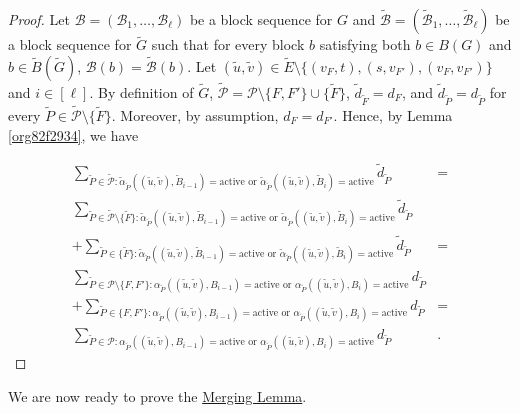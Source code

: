 \documentclass[fontsize=11pt,paper=a4]{book}
\begin{document}
\begin{proof}
Let \(\mathcal{B}=(\mathscr{B}_1,\dots,\mathscr{B}_{\ell})\) be a block sequence for \(G\) and \(\tilde{\mathcal{B}}=(\tilde{\mathscr{B}}_1,\dots,\tilde{\mathscr{B}}_{\ell})\) be a block sequence for \(\tilde{G}\) such that for every block \(b\) satisfying both \(b\in B(G)\) and \(b\in\tilde{B}(\tilde{G})\), \(\mathcal{B}(b)=\tilde{\mathcal{B}}(b)\).
Let \((\tilde{u},\tilde{v})\in\tilde{E}\setminus\{(v_F,t),(s,v_{F'}),(v_F,v_{F'})\}\) and \(i\in[\ell]\).
By definition of \(\tilde{G}\), \(\tilde{\mathcal{P}}=\mathcal{P}\setminus\{F,F'\}\cup\{\tilde{F}\}\), \(\tilde{d}_{\tilde{F}}=d_F\), and \(\tilde{d}_{\tilde{P}}=d_{\tilde{P}}\) for every \(\tilde{P}\in\tilde{\mathcal{P}}\setminus\{\tilde{F}\}\).
Moreover, by assumption, \(d_F=d_{F'}\).
Hence, by Lemma \ref{org82f2934}, we have

\begin{align*}
\sum_{\tilde{P}\in\tilde{\mathcal{P}}:\tilde{\alpha}_{\tilde{P}}((\tilde{u},\tilde{v}),\tilde{B}_{i-1})=\mathrm{active}\text{ or }\tilde{\alpha}_{\tilde{P}}((\tilde{u},\tilde{v}),\tilde{B}_i)=\mathrm{active}}\tilde{d}_{\tilde{P}}&=\\
\sum_{\tilde{P}\in\tilde{\mathcal{P}}\setminus\{\tilde{F}\}:\tilde{\alpha}_{\tilde{P}}((\tilde{u},\tilde{v}),\tilde{B}_{i-1})=\mathrm{active}\text{ or }\tilde{\alpha}_{\tilde{P}}((\tilde{u},\tilde{v}),\tilde{B}_i)=\mathrm{active}}\tilde{d}_{\tilde{P}}&\\
+\sum_{\tilde{P}\in\{\tilde{F}\}:\tilde{\alpha}_{\tilde{P}}((\tilde{u},\tilde{v}),\tilde{B}_{i-1})=\mathrm{active}\text{ or }\tilde{\alpha}_{\tilde{P}}((\tilde{u},\tilde{v}),\tilde{B}_i)=\mathrm{active}}\tilde{d}_{\tilde{P}}&=\\
\sum_{\tilde{P}\in\mathcal{P}\setminus\{F,F'\}:\alpha_{\tilde{P}}((\tilde{u},\tilde{v}),B_{i-1})=\mathrm{active}\text{ or }\alpha_{\tilde{P}}((\tilde{u},\tilde{v}),B_i)=\mathrm{active}}d_{\tilde{P}}&\\
+\sum_{\tilde{P}\in\{F,F'\}:\alpha_{\tilde{P}}((\tilde{u},\tilde{v}),B_{i-1})=\mathrm{active}\text{ or }\alpha_{\tilde{P}}((\tilde{u},\tilde{v}),B_i)=\mathrm{active}}d_{\tilde{P}}&=\\
\sum_{\tilde{P}\in\mathcal{P}:\alpha_{\tilde{P}}((\tilde{u},\tilde{v}),B_{i-1})=\mathrm{active}\text{ or }\alpha_{\tilde{P}}((\tilde{u},\tilde{v}),B_i)=\mathrm{active}}d_{\tilde{P}}&.
\end{align*}
\end{proof}

We are now ready to prove the \hyperref[orgf9b0f0c]{Merging Lemma}.
\end{document}
